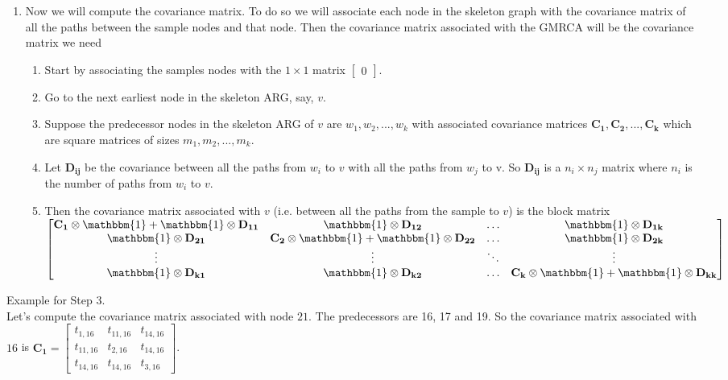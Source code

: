 \begin{enumerate}
    \item Now we will compute the covariance matrix. To do so we will associate each node in the skeleton graph with the covariance matrix of all the paths between the sample nodes and that node. Then the covariance matrix associated with the GMRCA will be the covariance matrix we need
    \begin{enumerate}
        \item Start by associating the samples nodes with the $1 \times 1$ matrix $\begin{bmatrix} 0 \end{bmatrix}$. 
        \item Go to the next earliest node in the skeleton ARG, say, $v$.
        \item Suppose the predecessor nodes in the skeleton ARG of $v$ are $w_1,w_2,...,w_k$ with associated covariance matrices $\mathbf{C_1,C_2,...,C_k}$ which are square matrices of sizes $m_1,m_2,...,m_k$. 
        \item Let $\mathbf{D_{ij}}$ be the covariance between all the paths from $w_i$ to $v$ with all the paths from $w_j$ to v. So $\mathbf{D_{ij}}$ is a $n_i \times n_j$ matrix where $n_i$ is the number of paths from $w_i$ to $v$. 
        \item Then the covariance matrix associated with $v$ (i.e. between all the paths from the sample to $v$) is the block matrix 
        $\begin{bmatrix}
           \mathbf{C_1} \otimes \mathbbm{1} + \mathbbm{1} \otimes \mathbf{D_{11}} & \mathbbm{1} \otimes \mathbf{D_{12}} & \hdots & \mathbbm{1} \otimes \mathbf{D_{1k}} \\
           \mathbbm{1} \otimes \mathbf{D_{21}} & \mathbf{C_2} \otimes \mathbbm{1} +  \mathbbm{1} \otimes \mathbf{D_{22}} & \hdots & \mathbbm{1} \otimes \mathbf{D_{2k}} \\ 
           \vdots & \vdots & \ddots & \vdots \\
           \mathbbm{1} \otimes \mathbf{D_{k1}} & \mathbbm{1} \otimes \mathbf{D_{k2}} & \hdots & \mathbf{C_k} \otimes \mathbbm{1} + \mathbbm{1} \otimes \mathbf{D_{kk}}
        \end{bmatrix}$
    \end{enumerate}
\end{enumerate}
Example for Step 3. \\
Let's compute the covariance matrix associated with node $21$. The predecessors are 16, 17 and 19. 
So the covariance matrix associated with $16$ is $\mathbf{C_1} = \begin{bmatrix}
   t_{1,16} & t_{11,16} & t_{14,16} \\
   t_{11,16} & t_{2,16} & t_{14,16} \\
   t_{14,16} & t_{14,16} & t_{3,16} 
\end{bmatrix}$. 
